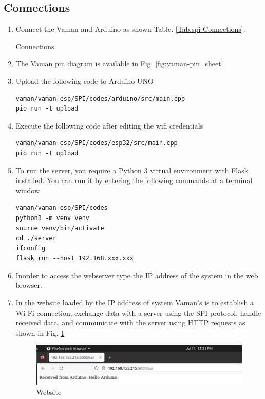 \subsection{Connections}
\begin{enumerate}[label=\thesection.\arabic*.,ref=\thesection.\theenumi]

	

\item
Connect the Vaman and Arduino as shown Table. \ref{Tab:spi-Connections}.

%
\begin{table}[!ht]
\centering

\caption{Connections}
\label{Tab:spi-Connections}
\end{table}
\item The Vaman pin diagram is available in Fig. \ref{fig:vaman-pin_sheet}

\item Upload the following code to Arduino UNO

\begin{lstlisting}
vaman/vaman-esp/SPI/codes/arduino/src/main.cpp
pio run -t upload
\end{lstlisting}

\item Execute the following code after editing the wifi credentials
\begin{lstlisting}
vaman/vaman-esp/SPI/codes/esp32/src/main.cpp
pio run -t upload 
\end{lstlisting}

\item To run the server, you require a Python 3 virtual environment with Flask
installed. You can run it by entering the following commands at a terminal
window
\begin{lstlisting}
vaman/vaman-esp/SPI/codes
python3 -m venv venv
source venv/bin/activate
cd ./server
ifconfig
flask run --host 192.168.xxx.xxx
\end{lstlisting}
\item Inorder to access the webserver type the IP address of the system  in the web browser.
\item In the website loaded by the IP address of system Vaman's is to establish a Wi-Fi connection, exchange data with a server using the SPI protocol, handle received data, and communicate with the server using HTTP requests as shown in  Fig. \ref{fig:results}
\begin{figure}[H]
\centering
\includegraphics[width=\columnwidth]{./vaman/vaman-esp/SPI/figs/result.png}
\caption{Website}
\label{fig:results}
\end{figure}
\end{enumerate}


